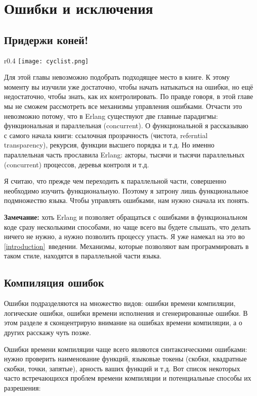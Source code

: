 \chapter{Ошибки и исключения}
\label{errors-and-exceptions}
\section{Придержи коней!}
\begin{wrapfigure}{r}{0.4\linewidth}
    \texttt{[image: cyclist.png]}
\end{wrapfigure}
Для этой главы невозможно подобрать подходящее место в книге.
К этому моменту вы изучили уже достаточно, чтобы начать натыкаться на ошибки, но ещё недостаточно, чтобы знать, как их контролировать.
По правде говоря, в этой главе мы не сможем рассмотреть все механизмы управления ошибками.
Отчасти это невозможно потому, что в Erlang существуют две главные парадигмы: функциональная и параллельная (concurrent).
О функциональной я рассказываю с самого начала книги: ссылочная прозрачность (чистота, referntial transparency), рекурсия, функции высшего порядка и т.д.
Но именно параллельная часть прославила Erlang: акторы, тысячи и тысячи параллельных (concurrent) процессов, деревья контроля и т.д.

Я считаю, что прежде чем переходить к параллельной части, совершенно необходимо изучить функциональную.
Поэтому я затрону лишь функциональное подмножество языка.
Чтобы управлять ошибками, нам нужно сначала их понять.\\
\colorbox{lgray}
{
\begin{minipage}{1.0\linewidth}
    \textbf{Замечание:} хоть Erlang и позволяет обращаться с ошибками в функциональном коде сразу несколькими способами, но чаще всего вы будете слышать, что делать ничего не нужно, а нужно позволить процессу упасть.
    Я уже намекал на это во \ref{introduction}~введении.
    Механизмы, которые позволяют вам программировать в таком стиле, находятся в параллельной части языка.
\end{minipage}
}
\section{Компиляция ошибок}
Ошибки подразделяются на множество видов: ошибки времени компиляции, логические ошибки, ошибки времени исполнения и сгенерированные ошибки.
В этом разделе я сконцентрирую внимание на ошибках времени компиляции, а о других расскажу чуть позже.

Ошибки времени компиляции чаще всего являются синтаксическими ошибками: нужно проверить наименование функций, языковые токены (скобки, квадратные скобки, точки, запятые), арность ваших функций и т.д.
Вот список некоторых часто встречающихся проблем времени компиляции и потенциальные способы их разрешения:

